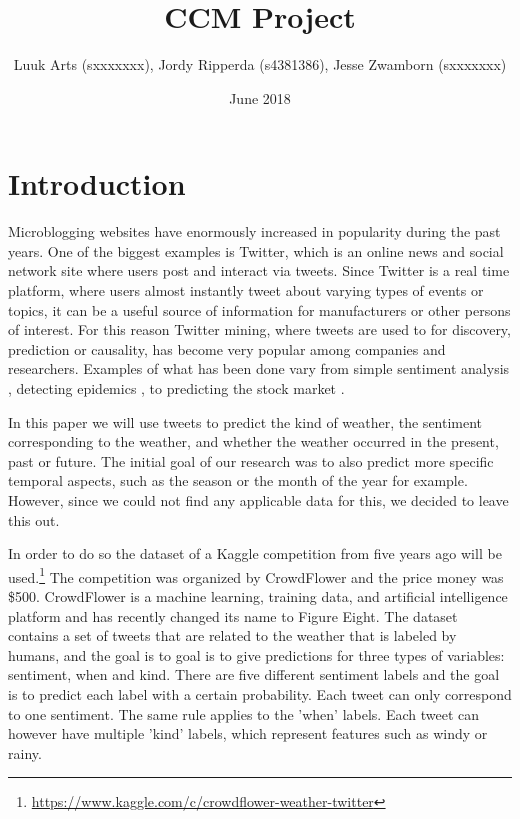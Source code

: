 \documentclass[11pt]{article}
\title{CCM Project}
\author{Luuk Arts (sxxxxxxx), Jordy Ripperda (s4381386), Jesse Zwamborn (sxxxxxxx)}
\date{June 2018}
\begin{document}


\section{Introduction}
Microblogging websites have enormously increased in popularity during the past years. One of the biggest examples is Twitter, which is an online news and social network site where users post and interact via tweets. Since Twitter is a real time platform, where users almost instantly tweet about varying types of events or topics, it can be a useful source of information for manufacturers or other persons of interest. For this reason Twitter mining, where tweets are used to for discovery, prediction or causality, has become very popular among companies and researchers. Examples of what has been done vary from simple sentiment analysis \cite{Agarwal2011, Go2009, Pak}, detecting epidemics \cite{Aramaki2011}, to predicting the stock market \cite{bollen2011twitter}. 

In this paper we will use tweets to predict the kind of weather, the sentiment corresponding to the weather, and whether the weather occurred in the present, past or future. The initial goal of our research was to also predict more specific temporal aspects, such as the season or the month of the year for example. However, since we could not find any applicable data for this, we decided to leave this out.

In order to do so the dataset of a Kaggle competition from five years ago will be used.\footnote{\url{https://www.kaggle.com/c/crowdflower-weather-twitter}} 
The competition was organized by CrowdFlower and the price money was \$500. CrowdFlower is a machine learning, training data, and artificial intelligence platform and has recently changed its name to Figure Eight. The dataset contains a set of tweets that are related to the weather that is labeled by humans, and the goal is to goal is to give predictions for three types of variables: sentiment, when and kind. There are five different sentiment labels and the goal is to predict each label with a certain probability. Each tweet can only correspond to one sentiment. The same rule applies to the 'when' labels. Each tweet can however have multiple 'kind' labels, which represent features such as windy or rainy. 
\end{document}
